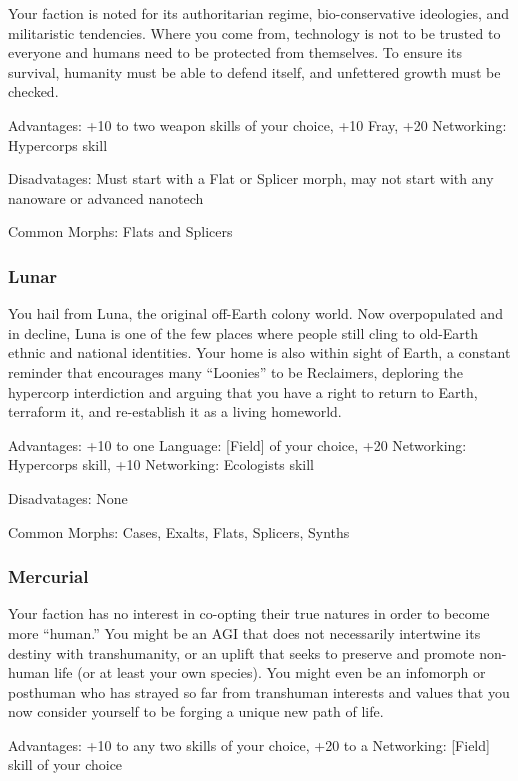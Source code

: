 Your faction is noted for its authoritarian regime, bio-conservative ideologies, and militaristic tendencies. Where you come from, technology is not to be trusted to everyone and humans need to be protected from themselves. To ensure its survival, humanity must be able to defend itself, and unfettered growth must be checked.

Advantages: +10 to two weapon skills of your choice, +10 Fray, +20 Networking: Hypercorps skill

Disadvatages: Must start with a Flat or Splicer morph, may not start with any nanoware or advanced nanotech

Common Morphs: Flats and Splicers

\subsubsection{Lunar}
\label{sec:lunar}

You hail from Luna, the original off-Earth colony world. Now overpopulated and in decline, Luna is one of the few places where people still cling to old-Earth ethnic and national identities. Your home is also within sight of Earth, a constant reminder that encourages many “Loonies” to be Reclaimers, deploring the hypercorp interdiction and arguing that you have a right to return to Earth, terraform it, and re-establish it as a living homeworld.

Advantages: +10 to one Language: [Field] of your choice, +20 Networking: Hypercorps skill, +10 Networking: Ecologists skill

Disadvatages: None

Common Morphs: Cases, Exalts, Flats, Splicers, Synths

\subsubsection{Mercurial}
\label{sec:mercurial}

Your faction has no interest in co-opting their true natures in order to become more “human.” You might be an AGI that does not necessarily intertwine its destiny with transhumanity, or an uplift that seeks to preserve and promote non-human life (or at least your own species). You might even be an infomorph or posthuman who has strayed so far from transhuman interests and values that you now consider yourself to be forging a unique new path of life.

Advantages: +10 to any two skills of your choice, +20 to a Networking: [Field] skill of your choice

